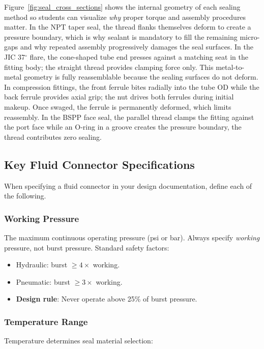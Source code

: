 \documentclass[11pt,letterpaper,twoside,openany]{book}
\providecommand{\ang}[1]{#1\ensuremath{{}^{\circ}}}
\begin{document}
Figure~\ref{fig:seal_cross_sections} shows the internal geometry of each sealing method so students can visualize \emph{why} proper torque and assembly procedures matter. In the NPT taper seal, the thread flanks themselves deform to create a pressure boundary, which is why sealant is mandatory to fill the remaining micro-gaps and why repeated assembly progressively damages the seal surfaces. In the JIC \ang{37} flare, the cone-shaped tube end presses against a matching seat in the fitting body; the straight thread provides clamping force only. This metal-to-metal geometry is fully reassemblable because the sealing surfaces do not deform. In compression fittings, the front ferrule bites radially into the tube OD while the back ferrule provides axial grip; the nut drives both ferrules during initial makeup. Once swaged, the ferrule is permanently deformed, which limits reassembly. In the BSPP face seal, the parallel thread clamps the fitting against the port face while an O-ring in a groove creates the pressure boundary, the thread contributes zero sealing.


\subsection{Key Fluid Connector Specifications}
\label{sec:fluidspecs}

When specifying a fluid connector in your design documentation, define each of the following.

\subsubsection{Working Pressure}

The maximum continuous operating pressure (psi or bar). Always specify \emph{working} pressure, not burst pressure. Standard safety factors:
\begin{itemize}[nosep,leftmargin=1.5em]
  \item Hydraulic: burst $\geq 4\times$ working.
  \item Pneumatic: burst $\geq 3\times$ working.
  \item \textbf{Design rule}: Never operate above 25\% of burst pressure.
\end{itemize}

\subsubsection{Temperature Range}

Temperature determines seal material selection:
\end{document}
